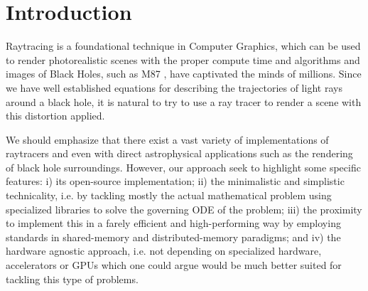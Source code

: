 


\section{Introduction}
\label{sec:intro}



Raytracing is a foundational technique in Computer Graphics, which can be used to render photorealistic scenes with the proper compute time and algorithms and images of Black Holes, such as M87 \cite{M87_EHT_i}, have captivated the minds of millions. Since we have well established equations for describing the trajectories of light rays around a black hole, it is natural to try to use a ray tracer to render a scene with this distortion applied.

We should emphasize that there exist a vast variety of implementations
of raytracers
\cite{sharma2023mahakalapythonbasedmodularraytracing,James_2015,imbens2023graphicalprocessinggeodesicpropagation}
and even with direct astrophysical applications such as
the rendering of black hole surroundings.
However, our approach seek to highlight some specific features:
i) its open-source implementation;
ii) the minimalistic and simplistic technicality, i.e. by tackling
mostly the actual mathematical problem using specialized libraries
to solve the governing ODE of the problem;
iii) the proximity to implement this in a farely efficient and high-performing
way by employing standards in shared-memory and distributed-memory paradigms;
and iv) the hardware agnostic approach, i.e. not depending on specialized hardware, accelerators or GPUs which one could argue would be much better suited for tackling this type of problems.

